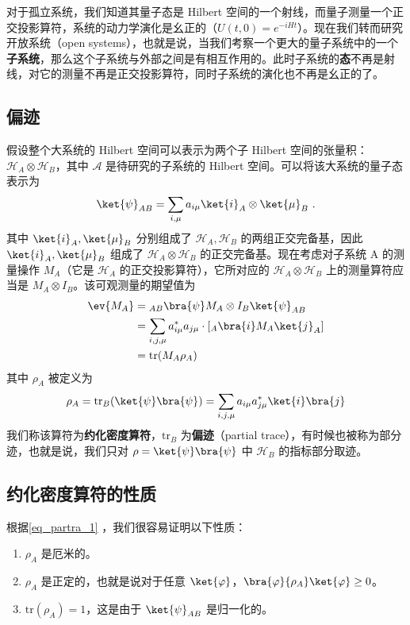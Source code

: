 

对于孤立系统，我们知道其量子态是 Hilbert 空间的一个射线，而量子测量一个正交投影算符，系统的动力学演化是幺正的（$U(t,0)=e^{-iHt}$）。现在我们转而研究开放系统（open systems），也就是说，当我们考察一个更大的量子系统中的一个\textbf{子系统}，那么这个子系统与外部之间是有相互作用的。此时子系统的\textbf{态}不再是射线，对它的测量不再是正交投影算符，同时子系统的演化也不再是幺正的了。
\subsection{偏迹}
假设整个大系统的 Hilbert 空间可以表示为两个子 Hilbert 空间的张量积：$\mathcal{H}_A\otimes \mathcal{H}_B$，其中 $\mathcal A$ 是待研究的子系统的 Hilbert 空间。可以将该大系统的量子态表示为
\begin{equation}
\ket{\psi}_{AB}=\sum_{i,\mu}a_{i\mu}\ket{i}_A\otimes \ket{\mu}_B~.
\end{equation}
其中 $\ket{i}_A,\ket{\mu}_B$ 分别组成了 $\mathcal{H}_A, \mathcal{H}_B$ 的两组正交完备基，因此 $\ket{i}_A,\ket{\mu}_B$ 组成了 $\mathcal{H}_A\otimes \mathcal{H}_B$ 的正交完备基。现在考虑对子系统 A 的测量操作 $M_A$（它是 $\mathcal H_A$ 的正交投影算符），它所对应的 $\mathcal{H}_A\otimes \mathcal{H}_B$ 上的测量算符应当是 $M_A\otimes I_B$。该可观测量的期望值为
\begin{equation}
\begin{aligned}
\ev{M_A}&={}_{AB}\bra{\psi}M_A\otimes I_B \ket{\psi}_{AB}\\
&=\sum_{i,j,\mu}a_{i\mu}^*a_{j\mu} \cdot [{}_A\bra{i} M_A \ket{j}_A]\\
&=\text{tr}(M_A \rho_A)
\end{aligned}
\end{equation}
其中 $\rho_A$ 被定义为
\begin{equation}\label{eq_partra_1}
\rho_A=\text{tr}_B(\ket{\psi}\bra{\psi})=\sum_{i,j,\mu}a_{i\mu}a_{j\mu}^*\ket{i}\bra{j}
\end{equation}
我们称该算符为\textbf{约化密度算符}，$\text{tr}_B$ 为\textbf{偏迹}（partial trace），有时候也被称为部分迹，也就是说，我们只对 $\rho=\ket{\psi}\bra{\psi}$ 中 $\mathcal{H}_B$ 的指标部分取迹。

\subsection{约化密度算符的性质}
根据\autoref{eq_partra_1} ，我们很容易证明以下性质：
\begin{enumerate}
\item $\rho_A$ 是厄米的。
\item $\rho_A$ 是正定的，也就是说对于任意 $\ket{\varphi}$，$\bra{\varphi}{\rho_A}\ket{\varphi}\ge 0$。
\item $\text{tr}(\rho_A)=1$，这是由于 $\ket{\psi}_{AB}$ 是归一化的。
\end{enumerate}


